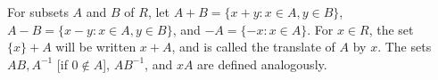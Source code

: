 For subsets $A$ and $B$ of $R$, let $A + B = \{x + y : x \in A, y \in B\}$, $A - B = \{x - y : x \in A, y \in B\}$, and $-A = \{-x : x \in A\}$. For $x \in R$, the set $\{x\} + A$ will be written $x + A$, and is called the translate of $A$ by $x$. The sets $AB, A^{-1}$ [if $0 \notin A$], $AB^{-1}$, and $xA$ are defined analogously.